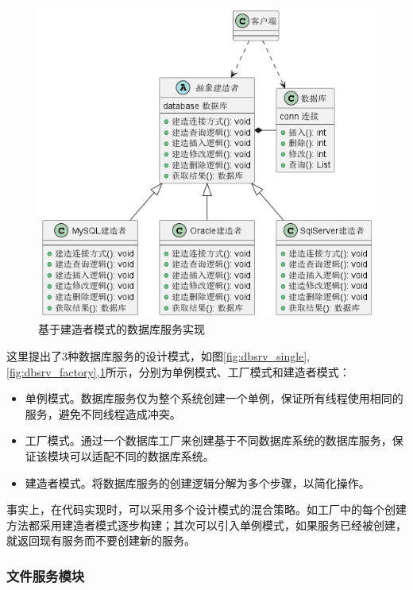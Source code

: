 \begin{figure}[H]
    \centering
    \includegraphics[scale=0.5]{examples/数据库服务-建造者模式.png}
    \caption{基于建造者模式的数据库服务实现}
    \label{fig:dbsrv_builder}
\end{figure}

这里提出了3种数据库服务的设计模式，如图\ref{fig:dbsrv_single},\ref{fig:dbsrv_factory},\ref{fig:dbsrv_builder}所示，分别为单例模式、工厂模式和建造者模式：
\begin{itemize}
    \item 单例模式。数据库服务仅为整个系统创建一个单例，保证所有线程使用相同的服务，避免不同线程造成冲突。
    \item 工厂模式。通过一个数据库工厂来创建基于不同数据库系统的数据库服务，保证该模块可以适配不同的数据库系统。
    \item 建造者模式。将数据库服务的创建逻辑分解为多个步骤，以简化操作。
\end{itemize}

事实上，在代码实现时，可以采用多个设计模式的混合策略。如工厂中的每个创建方法都采用建造者模式逐步构建；其次可以引入单例模式，如果服务已经被创建，就返回现有服务而不要创建新的服务。

\subsubsection{文件服务模块}

